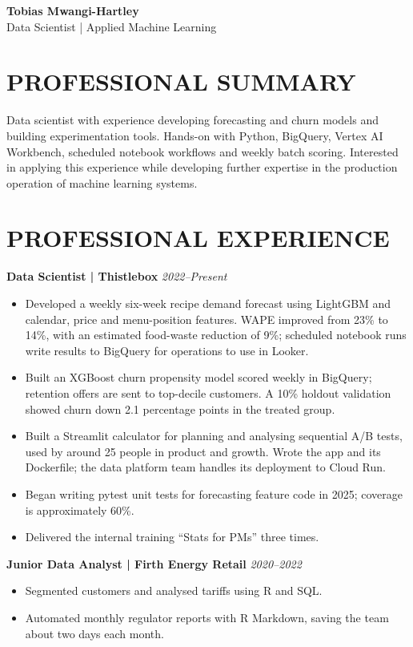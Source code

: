\documentclass[11pt,a4paper]{article}
\newcommand{\cvrole}[3]{\noindent\textbf{#1} \hfill \textit{#2}\\[-0.15em]#3\par}
\begin{document}
\begin{center}
{\Huge\bfseries\color{primarycolor} Tobias Mwangi-Hartley}\\[0.35em]
{\large\color{accentcolor} Data Scientist | Applied Machine Learning}
\end{center}
\vspace{0.4em}

\section*{PROFESSIONAL SUMMARY}
Data scientist with experience developing forecasting and churn models and building experimentation tools. Hands-on with Python, BigQuery, Vertex AI Workbench, scheduled notebook workflows and weekly batch scoring. Interested in applying this experience while developing further expertise in the production operation of machine learning systems.

\section*{PROFESSIONAL EXPERIENCE}
\cvrole{Data Scientist | Thistlebox}{2022--Present}{}
\begin{itemize}
\item Developed a weekly six-week recipe demand forecast using LightGBM and calendar, price and menu-position features. WAPE improved from 23\% to 14\%, with an estimated food-waste reduction of 9\%; scheduled notebook runs write results to BigQuery for operations to use in Looker.
\item Built an XGBoost churn propensity model scored weekly in BigQuery; retention offers are sent to top-decile customers. A 10\% holdout validation showed churn down 2.1 percentage points in the treated group.
\item Built a Streamlit calculator for planning and analysing sequential A/B tests, used by around 25 people in product and growth. Wrote the app and its Dockerfile; the data platform team handles its deployment to Cloud Run.
\item Began writing pytest unit tests for forecasting feature code in 2025; coverage is approximately 60\%.
\item Delivered the internal training ``Stats for PMs'' three times.
\end{itemize}

\cvrole{Junior Data Analyst | Firth Energy Retail}{2020--2022}{}
\begin{itemize}
\item Segmented customers and analysed tariffs using R and SQL.
\item Automated monthly regulator reports with R Markdown, saving the team about two days each month.
\end{itemize}
\end{document}
